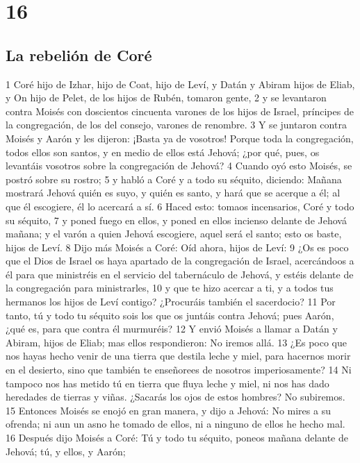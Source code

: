 \chapter{16}

\section*{La rebelión de Coré}

1 Coré hijo de Izhar, hijo de Coat, hijo de Leví, y Datán y Abiram hijos de Eliab, y On hijo de Pelet, de los hijos de Rubén, tomaron gente,
2 y se levantaron contra Moisés con doscientos cincuenta varones de los hijos de Israel, príncipes de la congregación, de los del consejo, varones de renombre.
3 Y se juntaron contra Moisés y Aarón y les dijeron: ¡Basta ya de vosotros! Porque toda la congregación, todos ellos son santos, y en medio de ellos está Jehová; ¿por qué, pues, os levantáis vosotros sobre la congregación de Jehová?
4 Cuando oyó esto Moisés, se postró sobre su rostro;
5 y habló a Coré y a todo su séquito, diciendo: Mañana mostrará Jehová quién es suyo, y quién es santo, y hará que se acerque a él; al que él escogiere, él lo acercará a sí.
6 Haced esto: tomaos incensarios, Coré y todo su séquito,
7 y poned fuego en ellos, y poned en ellos incienso delante de Jehová mañana; y el varón a quien Jehová escogiere, aquel será el santo; esto os baste, hijos de Leví.
8 Dijo más Moisés a Coré: Oíd ahora, hijos de Leví:
9 ¿Os es poco que el Dios de Israel os haya apartado de la congregación de Israel, acercándoos a él para que ministréis en el servicio del tabernáculo de Jehová, y estéis delante de la congregación para ministrarles,
10 y que te hizo acercar a ti, y a todos tus hermanos los hijos de Leví contigo? ¿Procuráis también el sacerdocio?
11 Por tanto, tú y todo tu séquito sois los que os juntáis contra Jehová; pues Aarón, ¿qué es, para que contra él murmuréis?
12 Y envió Moisés a llamar a Datán y Abiram, hijos de Eliab; mas ellos respondieron: No iremos allá.
13 ¿Es poco que nos hayas hecho venir de una tierra que destila leche y miel, para hacernos morir en el desierto, sino que también te enseñorees de nosotros imperiosamente?
14 Ni tampoco nos has metido tú en tierra que fluya leche y miel, ni nos has dado heredades de tierras y viñas. ¿Sacarás los ojos de estos hombres? No subiremos.
15 Entonces Moisés se enojó en gran manera, y dijo a Jehová: No mires a su ofrenda; ni aun un asno he tomado de ellos, ni a ninguno de ellos he hecho mal.
16 Después dijo Moisés a Coré: Tú y todo tu séquito, poneos mañana delante de Jehová; tú, y ellos, y Aarón;
